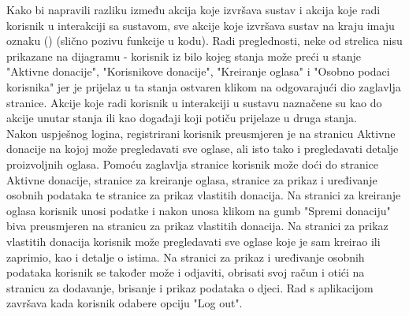                 Kako bi napravili razliku između akcija koje izvršava sustav i akcija koje radi korisnik u interakciji sa sustavom, sve akcije koje izvršava sustav na kraju imaju oznaku () (slično pozivu funkcije u kodu). Radi preglednosti, neke od strelica nisu prikazane na dijagramu - korisnik iz bilo kojeg stanja može preći u stanje "Aktivne donacije", "Korisnikove donacije", "Kreiranje oglasa" i "Osobno podaci korisnika" jer je prijelaz u ta stanja ostvaren klikom na odgovarajući dio zaglavlja stranice. Akcije koje radi korisnik u interakciji u sustavu naznačene su kao do akcije unutar stanja ili kao događaji koji potiču prijelaze u druga stanja.\\
                                
			Nakon uspješnog logina, registrirani korisnik preusmjeren je na stranicu Aktivne donacije na kojoj može pregledavati sve oglase, ali isto tako i pregledavati detalje proizvoljnih oglasa. Pomoću zaglavlja stranice korisnik može doći do stranice Aktivne donacije, stranice za kreiranje oglasa, stranice za prikaz i uređivanje osobnih podataka te stranice za prikaz vlastitih donacija. Na stranici za kreiranje oglasa korisnik unosi podatke i nakon unosa klikom na gumb "Spremi donaciju" biva preusmjeren na stranicu za prikaz vlastitih donacija. Na stranici za prikaz vlastitih donacija korisnik može pregledavati sve oglase koje je sam kreirao ili zaprimio, kao i detalje o istima. Na stranici za prikaz i uređivanje osobnih podataka korisnik se također može i odjaviti, obrisati svoj račun i otići na stranicu za dodavanje, brisanje i prikaz podataka o djeci. Rad s aplikacijom završava kada korisnik odabere opciju "Log out".

                \eject


